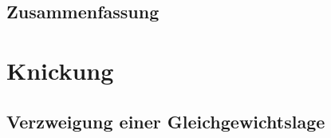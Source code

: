 \documentclass[11pt]{article}
\newcommand{\1}{ {\mathds{1}} }
\begin{document}
\begin{multicols*}{3}
		\begin{formel}{5.32}
			\times
		\end{formel}

		\begin{formel}{5.33}
			\times
		\end{formel}

		\begin{formel}{5.34}
			\times
		\end{formel}

		\subsection{Zusammenfassung}

		\setcounter{section}{6}

		\section{Knickung}
		\subsection{Verzweigung einer Gleichgewichtslage}


\end{multicols*}
\end{document}
